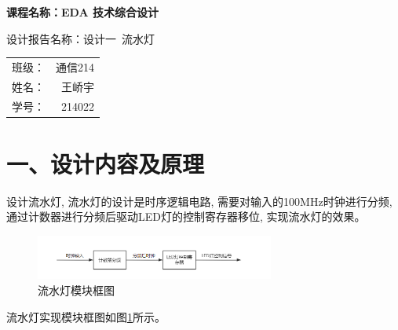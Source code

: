 \documentclass{article}
\newcommand{\fourhao}{\fontsize{14pt}{\baselineskip}\selectfont} %
\newcommand{\xiaosihao}{\fontsize{12pt}{\baselineskip}\selectfont} %
\begin{document}
\begin{titlepage}
    \centering
    \vspace*{2cm}

    \Huge
    \textbf{课程名称：EDA 技术综合设计}

    \vspace{2cm}

    \LARGE
    设计报告名称：设计一\ 流水灯

    \vspace{4cm}

    \centering
    \Large
    \begin{tabular}{rl}
        班级： & 通信214    \\
        姓名： & \ 王峤宇    \\
        学号： & \ 214022
    \end{tabular}

    \vfill

    \vspace{1cm}
\end{titlepage}

\newpage
\section*{\fourhao 一、设计内容及原理}
\xiaosihao
{}
设计流水灯, 流水灯的设计是时序逻辑电路, 需要对输入的100MHz时钟进行分频, 
通过计数器进行分频后驱动LED灯的控制寄存器移位, 实现流水灯的效果。
\begin{figure}[htbp]
    \centering
    \includegraphics[width=0.7\textwidth]{image/2024-06-28-12-46-01.png}
    \caption{流水灯模块框图}
    \label{image_principle_1}
\end{figure}
流水灯实现模块框图如图\ref{image_principle_1}所示。
\end{document}
